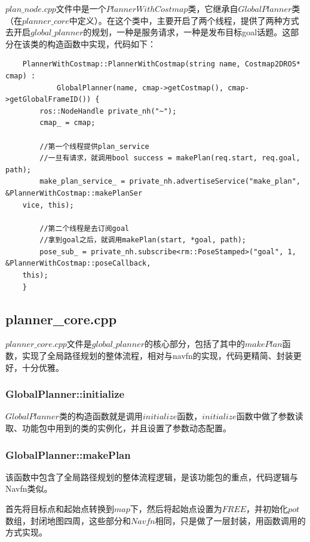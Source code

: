 \documentclass[9pt, oneside]{book}
\begin{document}
$plan\_node.cpp$文件中是一个$PlannerWithCostmap$类，它继承自$GlobalPlanner$类（在$planner\_core$中定义）。在这个类中，主要开启了两个线程，提供了两种方式去开启$global\_planner$的规划，一种是服务请求，一种是发布目标goal话题。这部分在该类的构造函数中实现，代码如下：

\footnotesize
\begin{verbatim}
    PlannerWithCostmap::PlannerWithCostmap(string name, Costmap2DROS* cmap) :
            GlobalPlanner(name, cmap->getCostmap(), cmap->getGlobalFrameID()) {
        ros::NodeHandle private_nh("~");
        cmap_ = cmap;

        //第一个线程提供plan_service
        //一旦有请求，就调用bool success = makePlan(req.start, req.goal, path);
        make_plan_service_ = private_nh.advertiseService("make_plan", &PlannerWithCostmap::makePlanSer
    vice, this);

        //第二个线程是去订阅goal
        //拿到goal之后，就调用makePlan(start, *goal, path);
        pose_sub_ = private_nh.subscribe<rm::PoseStamped>("goal", 1, &PlannerWithCostmap::poseCallback, 
    this);
    }
\end{verbatim}
\normalsize

\subsection{planner\_core.cpp}

$planner\_core.cpp$文件是$global\_planner$的核心部分，包括了其中的$makePlan$函数，实现了全局路径规划的整体流程，相对与navfn的实现，代码更精简、封装更好，十分优雅。

\subsubsection{GlobalPlanner::initialize}

$GlobalPlanner$类的构造函数就是调用$initialize$函数，$initialize$函数中做了参数读取、功能包中用到的类的实例化，并且设置了参数动态配置。

\subsubsection{GlobalPlanner::makePlan}

该函数中包含了全局路径规划的整体流程逻辑，是该功能包的重点，代码逻辑与Navfn类似。

首先将目标点和起始点转换到$map$下，然后将起始点设置为$FREE$，并初始化$pot$数组，封闭地图四周，这些部分和$Navfn$相同，只是做了一层封装，用函数调用的方式实现。
\end{document}
